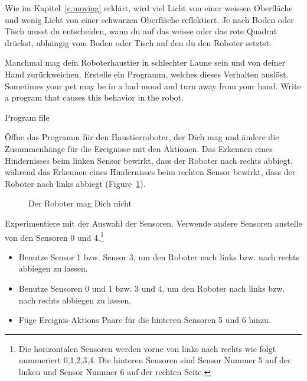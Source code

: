 Wie im Kapitel~\ref{c.moving} erklärt,
wird viel Licht von einer weissen Oberfläche
und wenig Licht von einer schwarzen Oberfläche reflektiert.
Je nach Boden oder Tisch musst du entscheiden,
wann du auf das weisse oder das rote Quadrat drückst,
abhängig vom Boden oder Tisch auf den du den Roboter setztst.

\newpage


Manchmal mag dein Roboterhaustier in schlechter Laune sein und von deiner Hand zurückweichen. Erstelle ein Programm, welches dieses Verhalten auslöst.
Sometimes your pet may be in a bad mood and turn away from your hand.
Write a program that causes this behavior in the robot.

{\raggedleft \hfill Program file }

Öffne das Programm für den Haustierroboter, 
der Dich mag und ändere die Zusammenhänge für die Ereignisse mit den Aktionen. 
Das Erkennen eines Hindernisses beim linken Sensor bewirkt, 
dass der Roboter nach rechts abbiegt, 
während das Erkennen eines Hindernisses beim rechten Sensor bewirkt, 
dass der Roboter nach links abbiegt (Figure~\ref{fig.hates}).

\begin{figure}[htb]
\begin{center}
\caption{Der Roboter mag Dich nicht}
\label{fig.hates}
\end{center}
\end{figure}


Experimentiere mit der Auswahl der Sensoren.
Verwende andere Sensoren anstelle von den Sensoren 0 und 4.\footnote{Die horizontalen Sensoren werden vorne von links nach rechts wie folgt nummeriert 0,1,2,3,4.
Die hinteren Sensoren sind Sensor Nummer 5 auf der linken und Sensor Nummer 6 auf der rechten Seite.}

\begin{itemize}

\item Benutze Sensor 1 bzw. Sensor 3, um den Roboter nach links bzw. nach rechts abbiegen zu lassen.
\item Benutze Sensoren 0 und 1 bzw. 3 und 4, um den Roboter nach links bzw. nach rechts abbiegen zu lassen.
\item Füge Ereignis-Aktions Paare für die hinteren Sensoren 5 und 6 hinzu.
\end{itemize}

